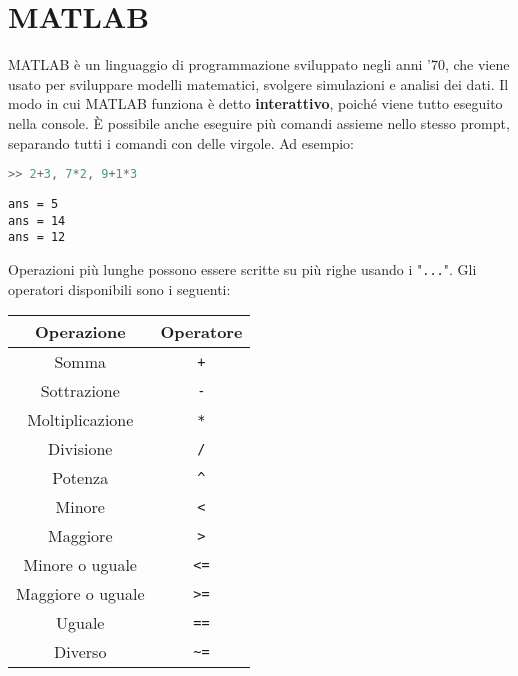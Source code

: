\chapter{MATLAB}

MATLAB è un linguaggio di programmazione sviluppato negli anni '70, che viene usato per sviluppare modelli matematici, svolgere simulazioni e analisi dei dati. Il modo in cui MATLAB funziona è detto \textbf{interattivo}, poiché viene tutto eseguito nella console. È possibile anche eseguire più comandi assieme nello stesso prompt, separando tutti i comandi con delle virgole. Ad esempio:

\begin{terminal}
    \begin{lstlisting}[language=MATLAB, style=notexterm]
>> 2+3, 7*2, 9+1*3\end{lstlisting}
    \tcblower
    \begin{lstlisting}[style=notexterm]
ans = 5
ans = 14
ans = 12\end{lstlisting}
\end{terminal}

Operazioni più lunghe possono essere scritte su più righe usando i "\texttt{...}". Gli operatori disponibili sono i seguenti:

\begin{center}
    \begin{tabular}{|c|c|}
        \hline
        \textbf{Operazione} & \textbf{Operatore} \\
        \hline \hline
        Somma & \texttt{+} \\
        \hline
        Sottrazione & \texttt{-} \\
        \hline
        Moltiplicazione & \texttt{*} \\
        \hline
        Divisione & \texttt{/} \\
        \hline
        Potenza & \verb|^| \\
        \hline\hline
        Minore & \texttt{<} \\
        \hline
        Maggiore & \texttt{>} \\
        \hline
        Minore o uguale & \texttt{<=} \\
        \hline
        Maggiore o uguale & \texttt{>=} \\
        \hline
        Uguale & \texttt{==} \\
        \hline
        Diverso & \verb|~=| \\
        \hline
    \end{tabular}
\end{center}

